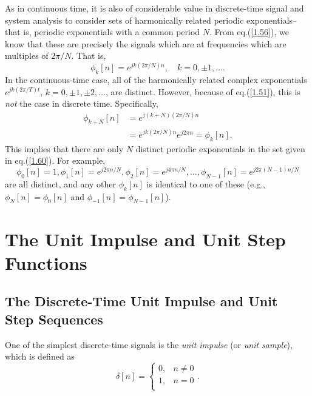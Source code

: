 \documentclass[a4paper,twoside]{book}
\begin{document}
As in continuous time, it is also of considerable value in discrete-time signal and system analysis to consider sets of harmonically related periodic exponentials--that is, periodic exponentials with a common period $N$. From eq.\;(\ref{1.56}), we know that these are precisely the signals which are at frequencies which are multiples of $2\pi/N$. That is,
\begin{equation}
    \phi_{k}[n] = e^{j k(2\pi/N)n},\quad k = 0,\pm1,\ldots.
    \label{1.60}
\end{equation}
In the continuous-time case, all of the harmonically related complex exponentials $e^{jk(2\pi/T)t}$, $k=0,\pm 1,\pm 2,\ldots$, are distinct. However, because of eq.\;(\ref{1.51}), this is \textit{not} the case in discrete time. Specifically,
\begin{equation}
    \begin{aligned}\phi_{k+N}[n]&= e^{j(k+N)(2\pi/N)n}\\&= e^{jk(2\pi/N)n}e^{j2\pi n} = \phi_{k}[n].\end{aligned}
    \label{1.61}
\end{equation}
This implies that there are only $N$ distinct periodic exponentials in the set given in eq.\;(\ref{1.60}). For example,
\begin{equation}
    \phi_{0}[n]=1,\phi_{1}[n]=e^{j2\pi n/N},\phi_{2}[n]=e^{j4\pi n/N},\ldots,\phi_{N-1}[n]=e^{j2\pi(N-1)n/N}
    \label{1.62}
\end{equation}
are all distinct, and any other $\phi_k[n]$ is identical to one of these (e.g., $\phi_N[n]=\phi_0[n]$ and $\phi_{-1}[n]=\phi_{N-1}[n]$).

\section{The Unit Impulse and Unit Step Functions}
\subsection{The Discrete-Time Unit Impulse and Unit Step Sequences}

One of the simplest discrete-time signals is the \textit{unit impulse} (or \textit{unit sample}), which is defined as
\begin{equation}
    \delta[n]=\left\{\begin{array}{ll}{0,}&{n\neq0}\\{1,}&{n=0}\\\end{array}\right..
    \label{1.63}
\end{equation}
\end{document}

